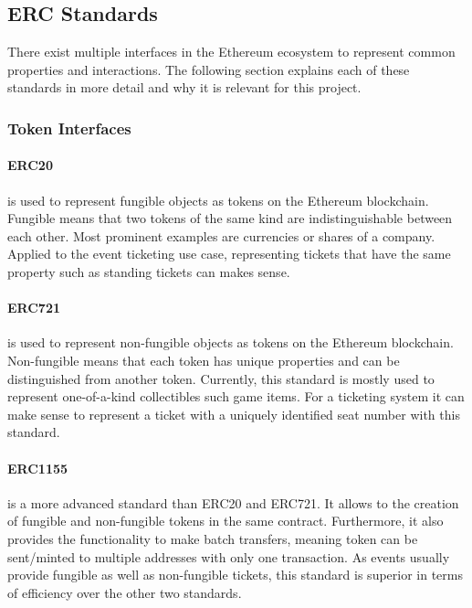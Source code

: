 \subsection{ERC Standards}

There exist multiple interfaces in the Ethereum ecosystem to represent common properties and interactions. The following section explains each of these standards in more detail and why it is relevant for this project.

\subsubsection{Token Interfaces}\label{subsubsection:token-interfaces}

\paragraph{ERC20} is used to represent fungible objects as tokens on the Ethereum blockchain. Fungible means that two tokens of the same kind are indistinguishable between each other. Most prominent examples are currencies or shares of a company. Applied to the event ticketing use case, representing tickets that have the same property such as standing tickets can makes sense.

\paragraph{ERC721} is used to represent non-fungible objects as tokens on the Ethereum blockchain. Non-fungible means that each token has unique properties and can be distinguished from another token. Currently, this standard is mostly used to represent one-of-a-kind collectibles such game items. For a ticketing system it can make sense to represent a ticket with a uniquely identified seat number with this standard. 

\paragraph{ERC1155} is a more advanced standard than ERC20 and ERC721. It allows to the creation of fungible and non-fungible tokens in the same contract. Furthermore, it also provides the functionality to make batch transfers, meaning token can be sent/minted to multiple addresses with only one transaction. As events usually provide fungible as well as non-fungible tickets, this standard is superior in terms of efficiency over the other two standards.

